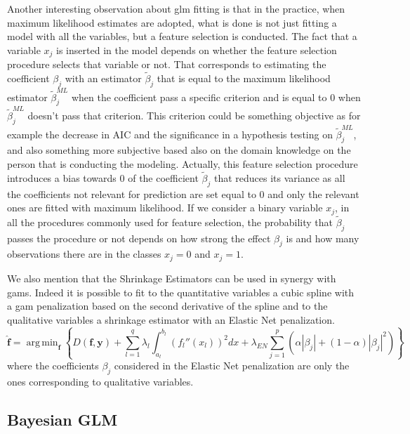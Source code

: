 \documentclass[a4paper, twoside, openright, 12pt]{report}
\DeclareMathOperator*{\argmin}{arg\,min}  %
\theoremstyle{definition}
\theoremstyle{definition}
\theoremstyle{definition}
\theoremstyle{remark}
\begin{document}
Another interesting observation about \ac{glm} fitting is that in the practice, when maximum likelihood estimates are adopted, what is done is not just fitting a model with all the variables, but a feature selection is conducted. The fact that a variable \(x_j\) is inserted in the model depends on whether the feature selection procedure selects that variable or not. That corresponds to estimating the coefficient \(\beta_j\) with an estimator \(\tilde{\beta}_j\) that is equal to the maximum likelihood estimator \(\tilde{\beta}_j^{ML}\) when the coefficient pass a specific criterion and is equal to \(0\) when \(\tilde{\beta}_j^{ML}\) doesn't pass that criterion. This criterion could be something objective as for example the decrease in AIC and the significance in a hypothesis testing on \(\tilde{\beta}_j^{ML}\), and also something more subjective based also on the domain knowledge on the person that is conducting the modeling. Actually, this feature selection procedure introduces a bias towards \(0\) of the coefficient \(\tilde{\beta}_j\) that reduces its variance as all the coefficients not relevant for prediction are set equal to \(0\) and only the relevant ones are fitted with maximum likelihood. If we consider a binary variable \(x_j\), in all the procedures commonly used for feature selection, the probability that \(\tilde{\beta}_j\) passes the procedure or not depends on how strong the effect \(\beta_j\) is and how many observations there are in the classes \(x_j=0\) and \(x_j=1\).

We also mention that the Shrinkage Estimators can be used in synergy with \ac{gam}s. Indeed it is possible to fit to the quantitative variables a cubic spline with a \ac{gam} penalization based on the second derivative of the spline and to the qualitative variables a shrinkage estimator with an Elastic Net penalization.
\begin{equation}
\label{eq:gam-en-est-deviance-multi}
\boldsymbol{\hat{f}} = \argmin_{\boldsymbol{f}}
{\left\{
  D(\boldsymbol{f}, \boldsymbol{y})
    + \sum_{l=1}^{q}{
      \lambda_l \int_{a_l}^{b_l}{\left( f_l''(x_l) \right)^2 dx}
    }
    + \lambda_{EN} 
      \sum_{j=1}^p{\left(\alpha |\beta_j| + (1 - \alpha) |\beta_j|^2\right)}
\right\}
} 
\end{equation}
where the coefficients \(\beta_j\) considered in the Elastic Net penalization are only the ones corresponding to qualitative variables.

\newpage

\hypertarget{chap:bayes-glm}{%
\subsection{Bayesian GLM}\label{chap:bayes-glm}}
\end{document}
